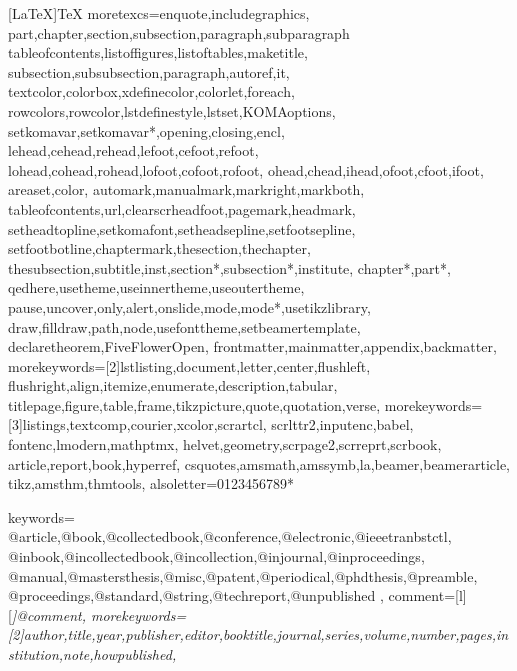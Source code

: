 \usepackage{listings}
[LaTeX]{TeX}%
  {moretexcs={enquote,includegraphics,%
    part,chapter,section,subsection,paragraph,subparagraph%
    tableofcontents,listoffigures,listoftables,maketitle,%
    subsection,subsubsection,paragraph,autoref,it,%
    textcolor,colorbox,xdefinecolor,colorlet,foreach,%
    rowcolors,rowcolor,lstdefinestyle,lstset,KOMAoptions,%
    setkomavar,setkomavar*,opening,closing,encl,%
    lehead,cehead,rehead,lefoot,cefoot,refoot,%
    lohead,cohead,rohead,lofoot,cofoot,rofoot,%
    ohead,chead,ihead,ofoot,cfoot,ifoot,%
    areaset,color,%
    automark,manualmark,markright,markboth,%
    tableofcontents,url,clearscrheadfoot,pagemark,headmark,%
    setheadtopline,setkomafont,setheadsepline,setfootsepline,%
    setfootbotline,chaptermark,thesection,thechapter,%
    thesubsection,subtitle,inst,section*,subsection*,institute,%
    chapter*,part*,%
    qedhere,usetheme,useinnertheme,useoutertheme,%
    pause,uncover,only,alert,onslide,mode,mode*,usetikzlibrary,%
    draw,filldraw,path,node,usefonttheme,setbeamertemplate,%
    declaretheorem,FiveFlowerOpen,%
    frontmatter,mainmatter,appendix,backmatter},%
  morekeywords={[2]lstlisting,document,letter,center,flushleft,%
    flushright,align,itemize,enumerate,description,tabular,%
    titlepage,figure,table,frame,tikzpicture,quote,quotation,verse},%
  morekeywords={[3]listings,textcomp,courier,xcolor,scrartcl,%
    scrlttr2,inputenc,babel,%
    fontenc,lmodern,mathptmx,%
    helvet,geometry,scrpage2,scrreprt,scrbook,%
    article,report,book,hyperref,%
    csquotes,amsmath,amssymb,la,beamer,beamerarticle,%
    tikz,amsthm,thmtools},
  alsoletter={0123456789*}
  }%

  {keywords={%
      @article,@book,@collectedbook,@conference,@electronic,@ieeetranbstctl,%
      @inbook,@incollectedbook,@incollection,@injournal,@inproceedings,%
      @manual,@mastersthesis,@misc,@patent,@periodical,@phdthesis,@preamble,%
      @proceedings,@standard,@string,@techreport,@unpublished%
      },
   comment=[l][\itshape]{@comment},
   morekeywords={[2]author,title,year,publisher,editor,booktitle,journal,series,volume,number,pages,institution,note,howpublished},
  }



